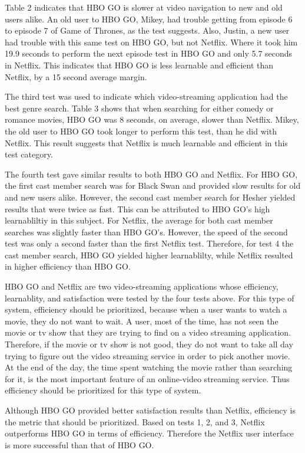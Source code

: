 \documentclass[11pt]{article}
\begin{document}
Table 2 indicates that HBO GO is slower at video navigation to new and old users alike. An old user to HBO GO, Mikey, had trouble getting from episode 6 to episode 7 of Game of Thrones, as the test suggests. Also, Justin, a new user had trouble with this same test on HBO GO, but not Netflix. Where it took him 19.9 seconds to perform the next episode test in HBO GO and only 5.7 seconds in Netflix. This indicates that HBO GO is less learnable and efficient than Netflix, by a 15 second average margin. 

The third test was used to indicate which video-streaming application had the best genre search. Table 3 shows that when searching for either comedy or romance movies, HBO GO was 8 seconds, on average, slower than Netflix. Mikey, the old user to HBO GO took longer to perform this test, than he did with Netflix. This result suggests that Netflix is much learnable and efficient in this test category.

The fourth test gave similar results to both HBO GO and Netflix. For HBO GO, the first cast member search was for Black Swan and provided slow results for old and new users alike. However, the second cast member search for Hesher yielded results that were twice as fast. This can be attributed to HBO GO's high learnabliltiy in this subject. For Netflix, the average for both cast member searches was slightly faster than HBO GO's. However, the speed of the second test was only a second faster than the first Netflix test. Therefore, for test 4 the cast member search, HBO GO yielded higher learnablilty, while Netflix resulted in higher efficiency than HBO GO.

 HBO GO and Netflix are two video-streaming applications whose efficiency, learnablity, and satisfaction were tested by the four tests above. For this type of system, efficiency should be prioritized, because when a user wants to watch a movie, they do not want to wait.  A user, most of the time, has not seen the movie or tv show that they are trying to find on a video streaming application. Therefore, if the movie or tv show is not good, they do not want to take all day trying to figure out the video streaming service in order to pick another movie. At the end of the day, the time spent watching the movie rather than searching for it, is the most important feature of an online-video streaming service. Thus efficiency should be prioritized for this type of system. 

Although HBO GO provided better satisfaction results than Netflix, efficiency is the metric that should be prioritized. Based on tests 1, 2, and 3, Netflix outperforms HBO GO in terms of efficiency. Therefore the Netflix user interface is more successful than that of HBO GO. 
\end{document}
